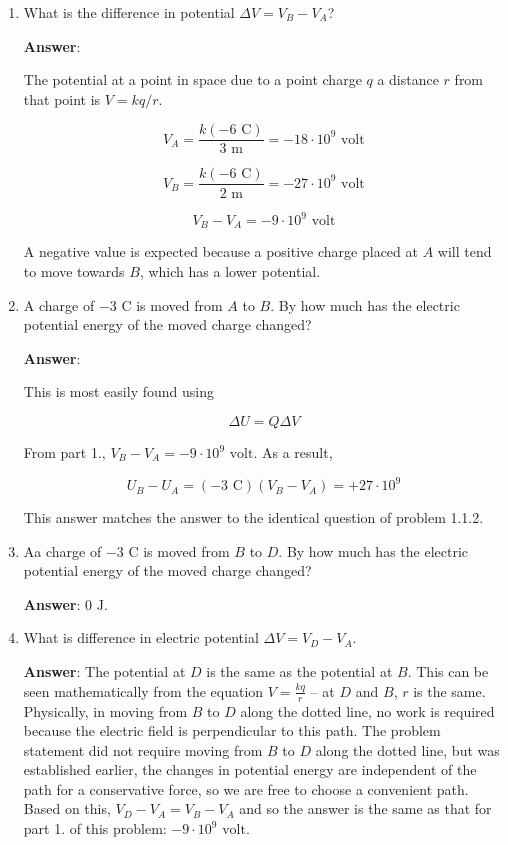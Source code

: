 \documentclass{article}
\begin{document}
\begin{enumerate}

  \item What is the difference in potential $\Delta V = V_B-V_A$?

        \ifsolutions
        {\bf Answer}:

        The potential at a point in space due to a point charge $q$ a distance $r$ from that point is $V={kq}/{r}$.

        $$V_A=\frac{k(-6\text{ C})}{3\text { m}}=-18\cdot 10^9\text{ volt}$$

        $$V_B=\frac{k(-6\text{ C})}{2\text { m}}=-27\cdot 10^9\text{ volt}$$

        $$V_B-V_A=-9\cdot 10^9\text{ volt}$$

        A negative value is expected because a positive charge placed at $A$ will tend to move towards $B$, which has a lower potential.
        \else

        \vskip 48pt
        \fi

  \item A charge of $-3\text{ C}$ is moved from $A$ to $B$. By how much has the electric potential energy of the moved charge changed?

        \ifsolutions
        {\bf Answer}:

        This is most easily found using

        $$\Delta U = Q{\Delta V}$$

        From part 1., $V_B-V_A=-9\cdot 10^9\text{ volt}$. As a result, 

        $$U_B-U_A= (-3\text{ C})(V_B-V_A)=+27\cdot 10^9$$

        This answer matches the answer to the identical question of problem 1.1.2.
        \else

        \vskip 48pt
        \fi

  \item Aa charge of $-3\text{ C}$ is moved from $B$ to $D$. By how much has the electric potential energy of the moved charge changed?

        \ifsolutions
        {\bf Answer}: $0\text{ J}$.
        \else

        \vskip 48pt
        \fi

  \item What is difference in electric potential $\Delta V = V_D-V_A$.

        \ifsolutions
        {\bf Answer}: The potential at $D$ is the same as the potential at $B$. This can be seen mathematically from the equation $V=\frac{kq}{r}$ -- at $D$ and $B$, $r$ is the same. Physically, in moving from $B$ to $D$ along the dotted line, no work is required because the electric field is perpendicular to this path. The problem statement did not require moving from $B$ to $D$ along the dotted line, but was established earlier, the changes in potential energy are independent of the path for a conservative force, so we are free to choose a convenient path. Based on this, $V_D-V_A=V_B-V_A$ and so the answer is the same as that for part 1. of this problem: $-9\cdot 10^9\text{ volt}$.
        \else


\end{enumerate}
\end{document}
